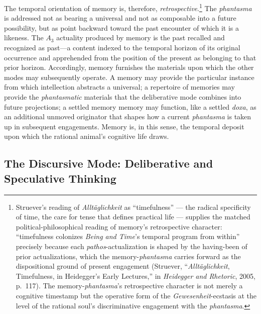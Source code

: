 \documentclass{article}
\begin{document}
The temporal orientation of memory is, therefore, \textit{retrospective}.\footnote{Struever's reading of \textit{Alltäglichkeit} as ``timefulness'' --- the radical specificity of time, the care for tense that defines practical life --- supplies the matched political-philosophical reading of memory's retrospective character: ``timefulness colonizes \textit{Being and Time}'s temporal program from within'' precisely because each \textit{pathos}-actualization is shaped by the having-been of prior actualizations, which the memory-\textit{phantasma} carries forward as the dispositional ground of present engagement (Struever, ``\textit{Alltäglichkeit}, Timefulness, in Heidegger's Early Lectures,'' in \textit{Heidegger and Rhetoric}, 2005, p.~117). The memory-\textit{phantasma}'s retrospective character is not merely a cognitive timestamp but the operative form of the \textit{Gewesenheit}-ecstasis at the level of the rational soul's discriminative engagement with the \textit{phantasma}.} The \textit{phantasma} is addressed not as bearing a universal and not as composable into a future possibility, but as point backward toward the past encounter of which it is a likeness. The $A_3$ actuality produced by memory is the past recalled and recognized as past---a content indexed to the temporal horizon of its original occurrence and apprehended from the position of the present as belonging to that prior horizon. Accordingly, memory furnishes the materials upon which the other modes may subsequently operate. A memory may provide the particular instance from which intellection abstracts a universal; a repertoire of memories may provide the \textit{phantasmatic} materials that the deliberative mode combines into future projections; a settled memory memory may function, like a settled \textit{doxa}, as an additional unmoved originator that shapes how a current \textit{phantasma} is taken up in subsequent engagements. Memory is, in this sense, the temporal deposit upon which the rational animal's cognitive life draws. 

\subsection{The Discursive Mode: Deliberative and Speculative Thinking}
\end{document}

